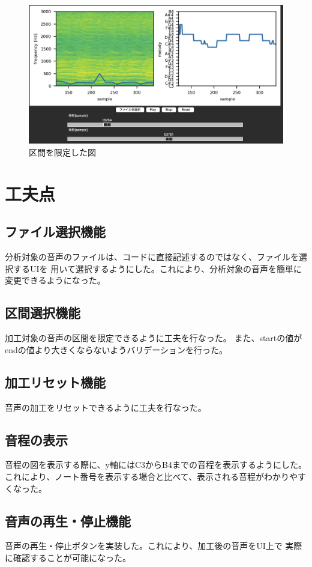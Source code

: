 \documentclass[a4paper,11pt]{jsarticle}
\begin{document}
\begin{figure}[h]
\centering
\includegraphics[keepaspectratio, width=13cm]
{./images/filtered_figures.jpg}
\caption{区間を限定した図}
\label{fig:filtered_figures}
\end{figure}

\section{工夫点}
\subsection{ファイル選択機能}
分析対象の音声のファイルは、コードに直接記述するのではなく、ファイルを選択するUIを
用いて選択するようにした。これにより、分析対象の音声を簡単に変更できるようになった。

\subsection{区間選択機能}
加工対象の音声の区間を限定できるように工夫を行なった。
また、startの値がendの値より大きくならないようバリデーションを行った。

\subsection{加工リセット機能}
音声の加工をリセットできるように工夫を行なった。

\subsection{音程の表示}
音程の図を表示する際に、y軸にはC3からB4までの音程を表示するようにした。
これにより、ノート番号を表示する場合と比べて、表示される音程がわかりやすくなった。

\subsection{音声の再生・停止機能}
音声の再生・停止ボタンを実装した。これにより、加工後の音声をUI上で
実際に確認することが可能になった。
\end{document}
